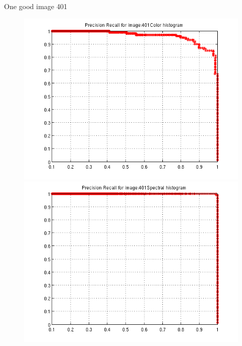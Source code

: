 \documentclass[a4paper,12pt]{article}
\begin{document}
One good image 401
\begin{figure}[h!]
    \centering
    \includegraphics[totalheight=.24\textheight]{../Results/PR/GoodColor.png}
    \includegraphics[totalheight=.24\textheight]{../Results/PR/GoodSpectral.png}
\end{figure}
\end{document}
